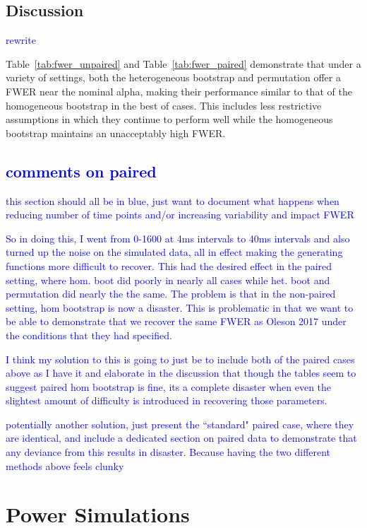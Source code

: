 \documentclass{article}
\providecommand{\cn}[1]{\textcolor{blue}{#1}}
\begin{document}
\subsection{Discussion}

\cn{rewrite}

Table~\ref{tab:fwer_unpaired} and Table~\ref{tab:fwer_paired} demonstrate that under a variety of settings, both the heterogeneous bootstrap and permutation offer a FWER near the nominal alpha, making their performance similar to that of the homogeneous bootstrap in the best of cases. This includes less restrictive assumptions in which they continue to perform well while the homogeneous bootstrap maintains an unacceptably high FWER. 


\subsection{\cn{comments on paired}}

\cn{this section should all be in blue, just want to document what happens when reducing number of time points and/or increasing variability and impact FWER}

\cn{So in doing  this, I went from 0-1600 at 4ms intervals to 40ms intervals and also turned up the noise on the simulated data, all in effect making the generating functions more difficult to recover. This had the desired effect in the paired setting, where hom. boot did poorly in nearly all cases while het. boot and permutation did nearly the the same. The problem is that in the non-paired setting, hom bootstrap is now a disaster. This is problematic in that we want to be able to demonstrate that we recover the same FWER as Oleson 2017 under the conditions that they had specified.}

\cn{I think my solution to this is going to just be to include both of the paired cases above as I have it and elaborate in the discussion that though the tables seem to suggest paired hom bootstrap is fine, its a complete disaster when even the slightest amount of difficulty is introduced in recovering those parameters. }

\cn{potentially another solution, just present the ``standard" paired case, where they are identical, and include a dedicated section on paired data to demonstrate that any deviance from this results in disaster. Because having the two different methods above feels clunky}

\section{Power Simulations}
\end{document}
